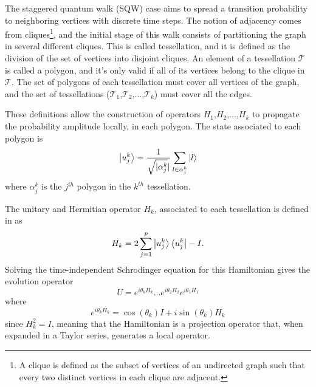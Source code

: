 \documentclass[../../dissertation.tex]{subfiles}
\begin{document}
The staggered quantum walk (SQW) case aims to spread a transition probability
to neighboring vertices with discrete time steps. The notion of adjacency comes
from cliques\footnote{A clique is defined as the subset of vertices of an
	undirected graph such that every two distinct vertices in each clique
are adjacent.}, and the initial stage of this walk consists of partitioning the
graph in several different cliques. This is called tessellation, and it is
defined as the division of the set of vertices into disjoint cliques. An
element of a tessellation $\mathscr{T}$ is called a polygon, and it's only
valid if all of its vertices belong to the clique in $\mathscr{T}$. The set of
polygons of each tessellation must cover all vertices of the graph, and the set
of tessellations ($\mathscr{T}_{1}$,$\mathscr{T}_{2}$,...,$\mathscr{T}_{k}$)
must cover all the edges.\par 

These definitions allow the construction of operators $H_1$,$H_2$,...,$H_k$ to
propagate the probability amplitude locally, in each polygon. The state
associated to each polygon is
\begin{equation}
	\ket{u_{j}^{k}} = \frac{1}{\sqrt{\mathopen|\alpha_{j}^{k}}\mathclose|}\sum_{l\in\alpha_{j}^{k}}\ket{l}
\end{equation}
where $\alpha_{j}^{k}$ is the $j^{th}$ polygon in the $k^{th}$ tessellation.\par

The unitary and Hermitian operator $H_k$, associated to each tessellation is
defined in \cite{portugal2017b} as
\begin{equation}
	H_k = 2\sum_{j=1}^{p}\ket{u_{j}^{k}}\bra{u_{j}^{k}} - I.
	\label{eq:StagHamil}
\end{equation}
Solving the time-independent Schrodinger equation for this Hamiltonian gives
the evolution operator 
\begin{equation}
	U = e^{i\theta_{k}H_{k}}...e^{i\theta_{2}H_{2}}e^{i\theta_{1}H_{1}}
	\label{eq:stagWalkUnmodOp}
\end{equation}
where
\begin{equation}
	e^{i\theta_{k}H_{k}} = \cos{(\theta_k)}I + i\sin{(\theta_k)}H_k
\end{equation}
since $H_k^2 = I$, meaning that the Hamiltonian is a projection operator that,
when expanded in a Taylor series, generates a local operator.\par
\end{document}
